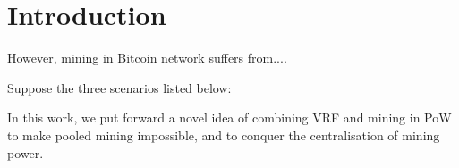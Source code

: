 \section{Introduction}




However, mining in Bitcoin network suffers from....



Suppose the three scenarios listed below:







In this work, we put forward a novel idea of combining VRF and mining in PoW to make pooled mining impossible, and to conquer the centralisation of mining power.